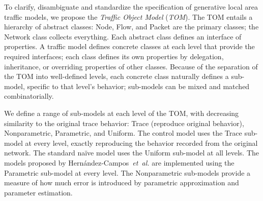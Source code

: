 \documentclass[conference]{IEEEtran}
\newcommand{\caps}[1]{{\small{#1}}}
\newcommand{\FHC}{Hern\'andez-Campos~\textit{et~al.}}
\newcommand{\class}[1]{\textsf{\small{#1}}}
\newcommand{\submodel}[1]{\textsf{\small{#1}}}
\begin{document}
To clarify, disambiguate and standardize the specification of generative local area traffic models, we propose the \textit{Traffic Object Model} (\textit{\caps{TOM}}). The \caps{TOM} entails a hierarchy of abstract classes: \class{Node}, \class{Flow}, and \class{Packet} are the primary classes; the \class{Network} class collects everything. Each abstract class defines an interface of properties. A traffic model defines concrete classes at each level that provide the required interfaces; each class defines its own properties by delegation, inheritance, or overriding properties of other classes. Because of the separation of the \caps{TOM} into well-defined levels, each concrete class naturally defines a sub-model, specific to that level's behavior; sub-models can be mixed and matched combinatorially.

We define a range of sub-models at each level of the \caps{TOM}, with decreasing similarity to the original trace behavior: \submodel{Trace} (reproduce original behavior), \submodel{Nonparametric}, \submodel{Parametric}, and \submodel{Uniform}. The control model uses the Trace sub-model at every level, exactly reproducing the behavior recorded from the original network. The standard na\"ive model uses the \submodel{Uniform} sub-model at all levels. The models proposed by {\FHC} are implemented using the \submodel{Parametric} sub-model at every level. The \submodel{Nonparametric} sub-models provide a measure of how much error is introduced by parametric approximation and parameter estimation.






\end{document}
